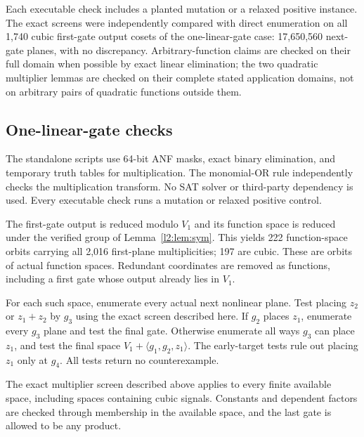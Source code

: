 \documentclass[11pt,a4paper]{article}
\theoremstyle{plain}
\theoremstyle{remark}
\begin{document}
Each executable check includes a planted mutation or a relaxed positive instance. The exact screens were independently compared with direct enumeration on all 1,740 cubic first-gate output cosets of the one-linear-gate case: 17,650,560 next-gate planes, with no discrepancy. Arbitrary-function claims are checked on their full domain when possible by exact linear elimination; the two quadratic multiplier lemmas are checked on their complete stated application domains, not on arbitrary pairs of quadratic functions outside them.

\subsection{One-linear-gate checks}

The standalone scripts use 64-bit ANF masks, exact binary elimination, and temporary truth tables for multiplication. The monomial-OR rule independently checks the multiplication transform. No SAT solver or third-party dependency is used. Every executable check runs a mutation or relaxed positive control.

The first-gate output is reduced modulo $V_1$ and its function space is reduced under the verified group of Lemma~\ref{l2:lem:sym}. This yields 222 function-space orbits carrying all 2,016 first-plane multiplicities; 197 are cubic. These are orbits of actual function spaces. Redundant coordinates are removed as functions, including a first gate whose output already lies in $V_1$.

For each such space, enumerate every actual next nonlinear plane. Test placing $z_2$ or $z_1+z_2$ by $g_3$ using the exact screen described here. If $g_2$ places $z_1$, enumerate every $g_3$ plane and test the final gate. Otherwise enumerate all ways $g_3$ can place $z_1$, and test the final space $V_1+\langle g_1,g_2,z_1\rangle$. The early-target tests rule out placing $z_1$ only at $g_4$. All tests return no counterexample.

The exact multiplier screen described above applies to every finite available space, including spaces containing cubic signals. Constants and dependent factors are checked through membership in the available space, and the last gate is allowed to be any product.
\end{document}
